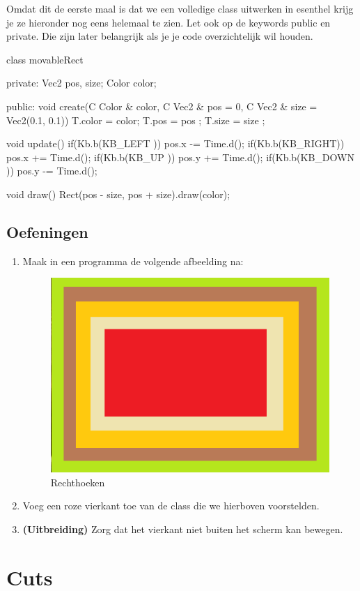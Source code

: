 Omdat dit de eerste maal is dat we een volledige class uitwerken in esenthel krijg je ze hieronder nog eens helemaal te zien. Let ook op de keywords public en private. Die zijn later belangrijk als je je code overzichtelijk wil houden.

\begin{code}
class movableRect {
private:
  Vec2 pos, size;
	Color color;
	
public:
  void create(C Color & color, C Vec2 & pos = 0, C Vec2 & size = Vec2(0.1, 0.1)) {
	  T.color = color;
		T.pos   = pos  ;
		T.size  = size ;
	}
	
	void update() {
		if(Kb.b(KB_LEFT )) pos.x -= Time.d();
		if(Kb.b(KB_RIGHT)) pos.x += Time.d();
		if(Kb.b(KB_UP   )) pos.y += Time.d();
		if(Kb.b(KB_DOWN )) pos.y -= Time.d();
	}
	
	void draw() {
		Rect(pos - size, pos + size).draw(color);
	}
}
\end{code}
	
\subsection{Oefeningen}

\begin{enumerate}
\item Maak in een programma de volgende afbeelding na:

\begin{figure}[h]
\centering
\includegraphics[width=0.4\linewidth]{../images/nested_rectangles.png}
\caption[]{Rechthoeken}
\label{fig:nested_rect}
\end{figure}

\item Voeg een roze vierkant toe van de class  die we hierboven voorstelden.
\item \textbf{(Uitbreiding)} Zorg dat het vierkant niet buiten het scherm kan bewegen.
\end{enumerate}

\section{Cuts}

